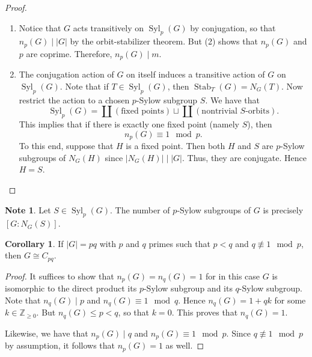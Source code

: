 \documentclass[10pt,letterpaper,cm]{nupset}
\theoremstyle{definition}
\newtheorem{note}[definition]{Note}
\theoremstyle{theorem}
\newtheorem{corollary}[definition]{Corollary}
\theoremstyle{remark}
\newcommand{\Z}{\mathbb Z}
\newcommand{\1}{\mathbf{1}}
\newcommand{\0}{\vec 0}
\DeclareMathOperator{\stab}{Stab}
\DeclareMathOperator{\Syl}{Syl}
\begin{document}
\begin{proof} $ $
\begin{enumerate}
\item Notice that $G$ acts transitively on $\Syl_p(G)$ by conjugation, so that $n_p(G) \mid \lvert{G}\rvert$ by the orbit-stabilizer theorem. But (2) shows that $n_p(G)$ and $p$ are coprime. Therefore, $n_p(G) \mid m$.
\item The conjugation action of $G$ on itself induces a transitive action of $G$ on $\Syl_p(G)$. Note that if $T \in \Syl_p(G)$, then $\stab_T(G) = N_G(T)$. Now restrict the action to a chosen $p$-Sylow subgroup $S$. We have  that $$\Syl_p(G) = \coprod{\left(\text{fixed points}\right)}\sqcup \coprod{\left(\text{nontrivial }S\text{-orbits}\right)}.$$ This implies that if there is exactly one fixed point (namely $S$), then $$n_p(G) \equiv 1 \mod p.$$ To this end, suppose that $H$ is a fixed point. Then both $H$ and $S$  are $p$-Sylow subgroups of $N_G(H)$ since $\lvert{N_G(H)}\rvert \mid \lvert{G}\rvert$. Thus, they are conjugate. Hence $H=S$.
\end{enumerate}
\end{proof}

\begin{note}
Let $S\in \Syl_p(G)$. The number of $p$-Sylow subgroups of $G$ is precisely $\left[G : N_G(S)\right]$.
\end{note}

\begin{corollary}
If $\lvert{G}\rvert = pq$ with $p$ and $q$ primes such that $p<q$ and $q \not \equiv 1 \mod p$, then $G\cong C_{pq}$. 
\end{corollary}
\begin{proof}
It suffices to show that $n_p(G) =n_q(G)=1$ for in this case $G$ is isomorphic to the direct product its $p$-Sylow subgroup and its $q$-Sylow subgroup. Note that $n_q(G)\mid p$ and $n_q(G) \equiv 1 \mod q$. Hence $n_q(G) = 1 + qk$ for some $k\in \Z_{\geq 0}$. But $n_q(G) \leq p <q$, so that $k=0$. This proves that $n_q(G)=1$.

Likewise, we have that $n_p(G)\mid q$ and $n_p(G) \equiv 1 \mod p$. Since $q \not \equiv 1 \mod p$ by assumption, it follows that $n_p(G) =1$ as well.
\end{proof}

\medskip
\end{document}
